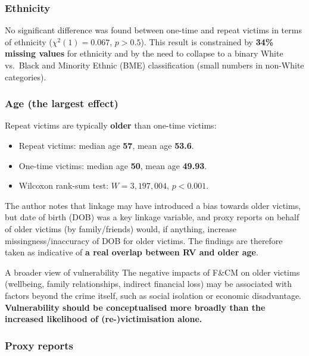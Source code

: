 \documentclass[11pt,a4paper,openany]{report}
\theoremstyle{definition}
\theoremstyle{plain}
\theoremstyle{remark}
\begin{document}
\subsubsection*{Ethnicity}

No significant difference was found between one-time and repeat victims in terms of ethnicity ($\chi^2(1) = 0.067$, $p > 0.5$). This result is constrained by \textbf{34\% missing values} for ethnicity and by the need to collapse to a binary White vs.\ Black and Minority Ethnic (BME) classification (small numbers in non-White categories).

\subsubsection*{Age (the largest effect)}

Repeat victims are typically \textbf{older} than one-time victims:

\begin{itemize}
    \item Repeat victims: median age \textbf{57}, mean age \textbf{53.6}.
    \item One-time victims: median age \textbf{50}, mean age \textbf{49.93}.
    \item Wilcoxon rank-sum test: $W = 3{,}197{,}004$, $p < 0.001$.
\end{itemize}

The author notes that linkage may have introduced a bias towards older victims, but date of birth (DOB) was a key linkage variable, and proxy reports on behalf of older victims (by family/friends) would, if anything, increase missingness/inaccuracy of DOB for older victims. The findings are therefore taken as indicative of \textbf{a real overlap between RV and older age}.

\begin{sourcebox}{A broader view of vulnerability}
The negative impacts of F\&CM on older victims (wellbeing, family relationships, indirect financial loss) may be associated with factors beyond the crime itself, such as social isolation or economic disadvantage. \textbf{Vulnerability should be conceptualised more broadly than the increased likelihood of (re-)victimisation alone.}
\end{sourcebox}

\subsubsection*{Proxy reports}
\end{document}
